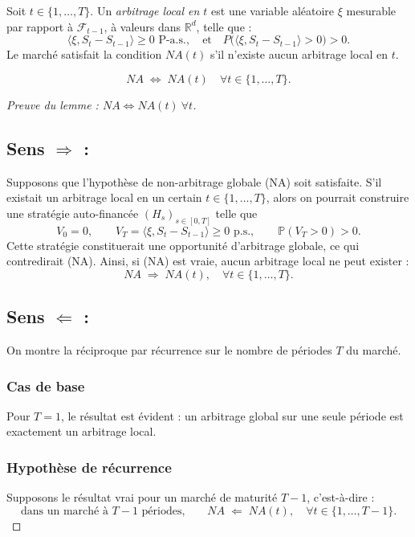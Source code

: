 \begin{definition}
Soit $t \in \{1, \dots, T\}$.  
Un \emph{arbitrage local en $t$} est une variable aléatoire $\xi$ mesurable par rapport à $\mathcal{F}_{t-1}$, à valeurs dans $\mathbb{R}^d$, telle que :
\[
\langle \xi, S_t - S_{t-1} \rangle \ge 0 \text{ P-a.s.}, 
\quad \text{et} \quad P\bigl( \langle \xi, S_t - S_{t-1} \rangle > 0 \bigr) > 0.
\]
Le marché satisfait la condition $NA(t)$ s'il n'existe aucun arbitrage local en $t$.
\end{definition}

\begin{lemme}
\[
NA \;\Longleftrightarrow\; NA(t) \quad \forall t \in \{1, \dots, T\}.
\]
\end{lemme}

\begin{proof}[Preuve du lemme : $NA \Longleftrightarrow NA(t)\ \forall t$]
\subsection*{Sens $\Rightarrow$ :}
Supposons que l'hypothèse de non-arbitrage globale (NA) soit satisfaite.  
S'il existait un arbitrage local en un certain $t \in \{1,\ldots,T\}$, alors on pourrait construire une stratégie auto-financée $(H_s)_{s\in[0,T]}$ telle que
\[
V_0 = 0, \qquad 
V_T = \langle \xi, S_t - S_{t-1} \rangle \ge 0 \text{ p.s.}, \qquad 
\mathbb{P}(V_T > 0) > 0.
\]
Cette stratégie constituerait une opportunité d'arbitrage globale, ce qui contredirait (NA).  
Ainsi, si (NA) est vraie, aucun arbitrage local ne peut exister :
\[
NA \;\Rightarrow\; NA(t), \quad \forall t\in\{1,\ldots,T\}.
\]

\subsection*{Sens $\Leftarrow$ :}
On montre la réciproque par récurrence sur le nombre de périodes $T$ du marché.

\subsubsection*{Cas de base}
Pour $T=1$, le résultat est évident : un arbitrage global sur une seule période est exactement un arbitrage local.

\subsubsection*{Hypothèse de récurrence}
Supposons le résultat vrai pour un marché de maturité $T-1$, c'est-à-dire :
\[
\text{dans un marché à $T-1$ périodes,} \qquad
NA \;\Leftarrow\; NA(t), \quad \forall t \in \{1,\ldots,T-1\}.
\]


\end{proof}
